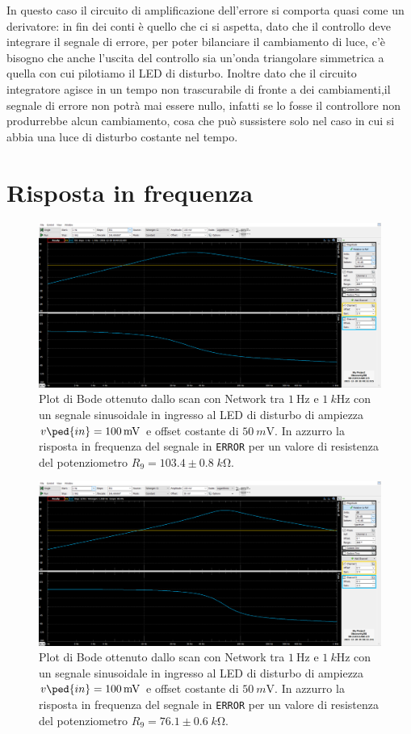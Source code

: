 \documentclass[10pt, a4paper, italian]{article}
\begin{document}
In questo caso il circuito di amplificazione dell'errore si comporta quasi come un derivatore: in fin dei conti è quello che ci si aspetta, dato che il controllo deve integrare il segnale di errore, per poter bilanciare il cambiamento di luce, c'è bisogno che anche l'uscita del controllo sia un'onda triangolare simmetrica a quella con cui pilotiamo il LED di disturbo. Inoltre dato che il circuito integratore agisce in un tempo non trascurabile di fronte a dei cambiamenti,il segnale di errore non potrà mai essere nullo, infatti se lo fosse il controllore non produrrebbe alcun cambiamento, cosa che può sussistere solo nel caso in cui si abbia una luce di disturbo costante nel tempo.

\section{Risposta in frequenza}
\begin{figure}[htbp]
    \centering
	\includegraphics[width=\textwidth]{103.4k}
    \caption{Plot di Bode ottenuto dallo scan con Network tra $\SI{1}{\Hz}$ e
	$\SI{1}{k\Hz}$ con un segnale sinusoidale in ingresso al LED di disturbo di
	ampiezza $v\ped{in} = \SI{100}{m\V}$ e offset costante di $\SI{50}{m\V}$.
	In azzurro la risposta in frequenza del segnale in \texttt{ERROR} per un
	valore di resistenza del potenziometro $R_9 = 103.4 \pm 0.8 \; \si{k\ohm}$.
    \label{fig: netR103}}
\end{figure}
\begin{figure}[htbp]
    \centering
	\includegraphics[width=\textwidth]{76.1k}
    \caption{Plot di Bode ottenuto dallo scan con Network tra $\SI{1}{\Hz}$ e
	$\SI{1}{k\Hz}$ con un segnale sinusoidale in ingresso al LED di disturbo di
	ampiezza $v\ped{in} = \SI{100}{m\V}$ e offset costante di $\SI{50}{m\V}$.
	In azzurro la risposta in frequenza del segnale in \texttt{ERROR} per un
	valore di resistenza del potenziometro $R_9 = 76.1 \pm 0.6 \; \si{k\ohm}$.
    \label{fig: netR76}}
\end{figure}
\end{document}
